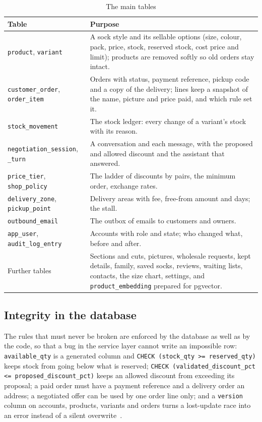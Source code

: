 \begin{table}[!htbp]
	\centering\small
	\begin{tabularx}{\textwidth}{p{4.4cm} X}
		\toprule
		\textbf{Table} & \textbf{Purpose} \\
		\midrule
		\texttt{product}, \texttt{variant} & A sock style and its sellable options (size, colour, pack, price, stock,
		reserved stock, cost price and limit); products are removed softly so old orders stay intact. \\
		\texttt{customer\_order}, \texttt{order\_item} & Orders with status, payment reference, pickup code and a copy of
		the delivery; lines keep a snapshot of the name, picture and price paid, and which rule set it. \\
		\texttt{stock\_movement} & The stock ledger: every change of a variant's stock with its reason. \\
		\texttt{negotiation\_session}, \texttt{\_turn} & A conversation and each message, with the proposed and allowed
		discount and the assistant that answered. \\
		\texttt{price\_tier}, \texttt{shop\_policy} & The ladder of discounts by pairs, the minimum order, exchange rates. \\
		\texttt{delivery\_zone}, \texttt{pickup\_point} & Delivery areas with fee, free-from amount and days; the stall. \\
		\texttt{outbound\_email} & The outbox of emails to customers and owners. \\
		\texttt{app\_user}, \texttt{audit\_log\_entry} & Accounts with role and state; who changed what, before and after. \\
		Further tables & Sections and cuts, pictures, wholesale requests, kept details, family, saved socks, reviews,
		waiting lists, contacts, the size chart, settings, and \texttt{product\_embedding} prepared for pgvector. \\
		\bottomrule
	\end{tabularx}
	\caption{The main tables}
	\label{tab:tables}
\end{table}

\subsection{Integrity in the database}

The rules that must never be broken are enforced by the database as well as by the code, so that a bug in the service
layer cannot write an impossible row: \texttt{available\_qty} is a generated column and
\texttt{CHECK (stock\_qty >= reserved\_qty)} keeps stock from going below what is reserved;
\texttt{CHECK (validated\_discount\_pct <= proposed\_discount\_pct)} keeps an allowed discount from exceeding its
proposal; a paid order must have a payment reference and a delivery order an address; a negotiated offer can be used by
one order line only; and a \texttt{version} column on accounts, products, variants and orders turns a lost-update race
into an error instead of a silent overwrite~\cite{fowler2002peaa}.

